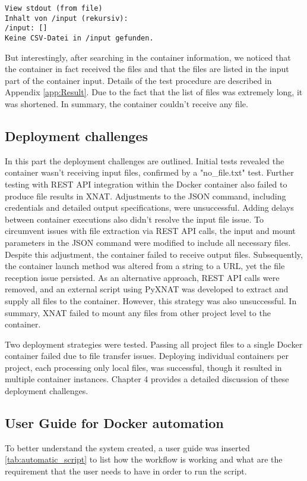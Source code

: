 \begin{lstlisting}[numbers=none, caption={stdout in XNAT.}, label={lst:stdout}]
View stdout (from file)
Inhalt von /input (rekursiv):
/input: []
Keine CSV-Datei in /input gefunden.
\end{lstlisting}


\normalsize
But interestingly, after searching in the container information, we noticed that the container in fact received the files and that the files are listed in the input part of the container input. 
Details of the test procedure are described in Appendix 
\autoref{app:Result}. Due to the fact that the list of files was extremely long, it was shortened. In summary, the container couldn't receive any file.
\normalsize
\subsection{Deployment challenges}
 In this part the deployment challenges are outlined. Initial tests revealed the container wasn't receiving input files, confirmed by a "no\_file.txt" test. Further testing with REST API integration within the Docker container also failed to produce file results in XNAT. Adjustments to the JSON command, including credentials and detailed output specifications, were unsuccessful. Adding delays between container executions also didn't resolve the input file issue.
To circumvent issues with file extraction via REST API calls, the input and mount parameters in the JSON command were modified to include all necessary files. Despite this adjustment, the container failed to receive output files. Subsequently, the container launch method was altered from a string to a URL, yet the file reception issue persisted. As an alternative approach, REST API calls were removed, and an external script using PyXNAT was developed to extract and supply all files to the container. However, this strategy was also unsuccessful. In summary, XNAT failed to mount any files  from other project level to the container.

Two deployment strategies were tested. Passing all project files to a single Docker container failed due to file transfer issues. Deploying individual containers per project, each processing only local files, was successful, though it resulted in multiple container instances. Chapter 4 provides a detailed discussion of these deployment challenges. 


\normalsize



\subsection{User Guide for Docker automation}
To better understand the system created, a user guide was inserted \autoref{tab:automatic_script} to list how the workflow is working and what are the requirement that the user needs to have in order to run the script. 

